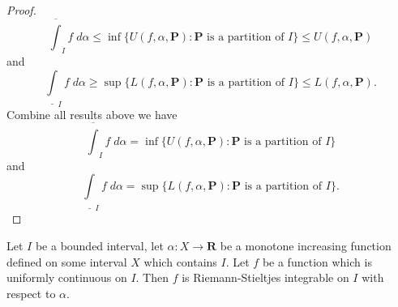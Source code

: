 \begin{proof}
    \[
        \overline{\int}_I f \; d \alpha \leq \inf\big\{U(f, \alpha, \mathbf{P}) : \mathbf{P} \text{ is a partition of } I\big\} \leq U(f, \alpha, \mathbf{P})
    \]
    and
    \[
        \underline{\int}_I f \; d \alpha \geq \sup\big\{L(f, \alpha, \mathbf{P}) : \mathbf{P} \text{ is a partition of } I\big\} \leq L(f, \alpha, \mathbf{P}).
    \]
    Combine all results above we have
    \[
        \overline{\int}_I f \; d \alpha = \inf\big\{U(f, \alpha, \mathbf{P}) : \mathbf{P} \text{ is a partition of } I\big\}
    \]
    and
    \[
        \underline{\int}_I f \; d \alpha = \sup\big\{L(f, \alpha, \mathbf{P}) : \mathbf{P} \text{ is a partition of } I\big\}.
    \]
\end{proof}

\begin{additional corollary}\label{ac 11.8.14}
Let \(I\) be a bounded interval, let \(\alpha : X \to \mathbf{R}\) be a monotone increasing function defined on some interval \(X\) which contains \(I\).
Let \(f\) be a function which is uniformly continuous on \(I\).
Then \(f\) is Riemann-Stieltjes integrable on \(I\) with respect to \(\alpha\).
\end{additional corollary}

